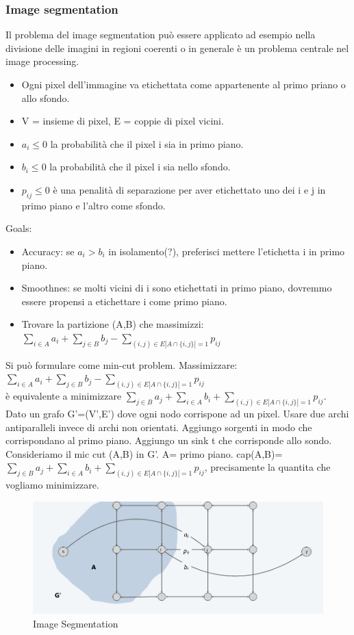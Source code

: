 \documentclass{article}
\begin{document}
\subsubsection{Image segmentation}
Il problema del image segmentation può essere applicato ad esempio nella divisione delle imagini in regioni coerenti o in generale è un problema centrale nel image processing.\\
\begin{itemize}
    \item Ogni pixel dell'immagine va etichettata come appartenente al primo priano o allo sfondo.
    \item V = insieme di pixel, E = coppie di pixel vicini.
    \item $a_i\leq 0$ la probabilità che il pixel i sia in primo piano.
    \item $b_i\leq 0$ la probabilità che il pixel i sia nello sfondo.
    \item $p_{ij}\leq 0$ è una penalità di separazione per aver etichettato uno dei i e j in primo piano e l'altro come sfondo.
\end{itemize}
Goals:
\begin{itemize}
    \item Accuracy: se $a_i>b_i$ in isolamento(?), preferisci mettere l'etichetta i in primo piano.
    \item Smoothnes: se molti vicini di i sono etichettati in primo piano, dovremmo essere propensi a etichettare i come primo piano.
    \item Trovare la partizione (A,B) che massimizzi:\\ $\sum_{i\in A}a_i+\sum_{j\in B}b_j-\sum_{(i,j)\in E |A\cap\{i,j\}|=1}p_{ij}$
\end{itemize}
Si può formulare come min-cut problem. Massimizzare:\\  $\sum_{i\in A}a_i+\sum_{j\in B}b_j-\sum_{(i,j)\in E |A\cap\{i,j\}|=1}p_{ij}$ \\
è equivalente a minimizzare  $\sum_{j\in B}a_j+\sum_{i\in A}b_i+\sum_{(i,j)\in E |A\cap\{i,j\}|=1}p_{ij}$.\\
Dato un grafo G'=(V',E') dove ogni nodo corrispone ad un pixel. Usare due archi antiparalleli invece di archi non orientati. Aggiungo sorgenti in modo che corrispondano al primo piano. Aggiungo un sink t che corrisponde allo sondo.\\
Consideriamo il mic cut (A,B) in G'. A= primo piano. cap(A,B)=$\sum_{j\in B}a_j+\sum_{i\in A}b_i+\sum_{(i,j)\in E |A\cap\{i,j\}|=1}p_{ij}$, precisamente la quantita che vogliamo minimizzare.
\begin{figure}[H]
    \centering
    \includegraphics[width=0.5\linewidth]{Screenshot from 2024-05-05 12-15-08.png}
    \caption{Image Segmentation}
    \label{fig:enter-label}
\end{figure}
\newpage
\end{document}
